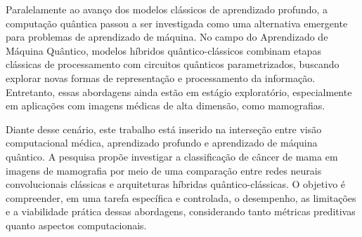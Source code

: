 \documentclass[
    12pt,
    openright,
    oneside,
    a4paper,
    english,
    brazil
]{abntex2}
\begin{document}
Paralelamente ao avanço dos modelos clássicos de aprendizado profundo, a computação quântica passou a ser investigada como uma alternativa emergente para problemas de aprendizado de máquina. No campo do Aprendizado de Máquina Quântico, modelos híbridos quântico-clássicos combinam etapas clássicas de processamento com circuitos quânticos parametrizados, buscando explorar novas formas de representação e processamento da informação. Entretanto, essas abordagens ainda estão em estágio exploratório, especialmente em aplicações com imagens médicas de alta dimensão, como mamografias.

Diante desse cenário, este trabalho está inserido na interseção entre visão computacional médica, aprendizado profundo e aprendizado de máquina quântico. A pesquisa propõe investigar a classificação de câncer de mama em imagens de mamografia por meio de uma comparação entre redes neurais convolucionais clássicas e arquiteturas híbridas quântico-clássicas. O objetivo é compreender, em uma tarefa específica e controlada, o desempenho, as limitações e a viabilidade prática dessas abordagens, considerando tanto métricas preditivas quanto aspectos computacionais.
\end{document}
